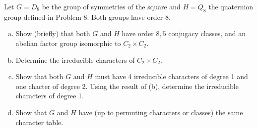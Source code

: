 \documentclass[leqno]{article}
\begin{document}
\newpage
\begin{problem}
Let $G=D_8$ be the group of symmetries of the square and $H=Q_8$ the quaternion group defined in Problem 8. Both groups have order 8.
\begin{enumerate}[(a)]
    \item Show (briefly) that both $G$ and $H$ have order $8,5$ conjugacy classes, and an abelian factor group isomorphic to $C_2 \times C_2$.
    \item Determine the irreducible characters of $C_2\times C_2$.
    \item Show that both $G$ and $H$ must have 4 irreducible characters of degree 1 and one chacter of degree 2. Using the result of (b), determine the irreducible characters of degree 1.
    \item Show that $G$ and $H$ have (up to permuting characters or classes) the same character table.
\end{enumerate}
\end{problem}
\end{document}
